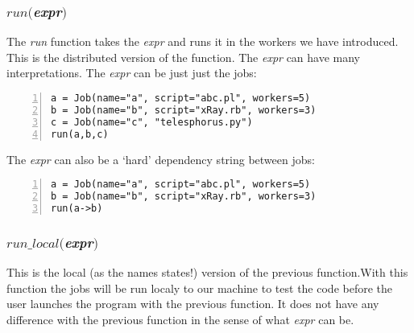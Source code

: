 \subsubsection*{$run($\textit{expr}$)$}
The \textit{run} function takes the \textit{expr} and runs it in the workers we have introduced.
This is the distributed version of the function.
The \textit{expr} can have many interpretations. The \textit{expr} can be just just the jobs:
\begin{Verbatim}[numbers=left]
a = Job(name="a", script="abc.pl", workers=5)
b = Job(name="b", script="xRay.rb", workers=3)
c = Job(name="c", "telesphorus.py")
run(a,b,c)
\end{Verbatim}
The \textit{expr} can also be a `hard' dependency string between jobs:
\begin{Verbatim}[numbers=left]
a = Job(name="a", script="abc.pl", workers=5)
b = Job(name="b", script="xRay.rb", workers=3)
run(a->b)
\end{Verbatim}
\subsubsection*{$run\_local($\textit{expr}$)$}
This is the local (as the names states!) version of the previous function.With this function the jobs will be run localy to our machine to test the code before the user launches the program with the previous function. It does not have any difference with the previous function in the sense of what \textit{expr} can be.
